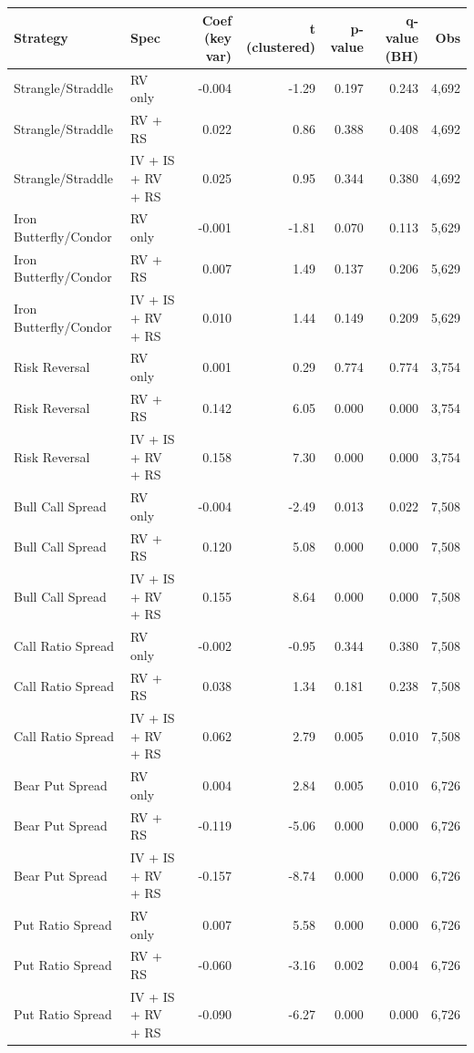 \begin{tabular}{llrrrrr}
\toprule
Strategy & Spec & Coef (key var) & t (clustered) & p-value & q-value (BH) & Obs \\
\midrule
Strangle/Straddle & RV only & -0.004 & -1.29 & 0.197 & 0.243 & 4,692 \\
Strangle/Straddle & RV + RS & 0.022 & 0.86 & 0.388 & 0.408 & 4,692 \\
Strangle/Straddle & IV + IS + RV + RS & 0.025 & 0.95 & 0.344 & 0.380 & 4,692 \\
Iron Butterfly/Condor & RV only & -0.001 & -1.81 & 0.070 & 0.113 & 5,629 \\
Iron Butterfly/Condor & RV + RS & 0.007 & 1.49 & 0.137 & 0.206 & 5,629 \\
Iron Butterfly/Condor & IV + IS + RV + RS & 0.010 & 1.44 & 0.149 & 0.209 & 5,629 \\
Risk Reversal & RV only & 0.001 & 0.29 & 0.774 & 0.774 & 3,754 \\
Risk Reversal & RV + RS & 0.142 & 6.05 & 0.000 & 0.000 & 3,754 \\
Risk Reversal & IV + IS + RV + RS & 0.158 & 7.30 & 0.000 & 0.000 & 3,754 \\
Bull Call Spread & RV only & -0.004 & -2.49 & 0.013 & 0.022 & 7,508 \\
Bull Call Spread & RV + RS & 0.120 & 5.08 & 0.000 & 0.000 & 7,508 \\
Bull Call Spread & IV + IS + RV + RS & 0.155 & 8.64 & 0.000 & 0.000 & 7,508 \\
Call Ratio Spread & RV only & -0.002 & -0.95 & 0.344 & 0.380 & 7,508 \\
Call Ratio Spread & RV + RS & 0.038 & 1.34 & 0.181 & 0.238 & 7,508 \\
Call Ratio Spread & IV + IS + RV + RS & 0.062 & 2.79 & 0.005 & 0.010 & 7,508 \\
Bear Put Spread & RV only & 0.004 & 2.84 & 0.005 & 0.010 & 6,726 \\
Bear Put Spread & RV + RS & -0.119 & -5.06 & 0.000 & 0.000 & 6,726 \\
Bear Put Spread & IV + IS + RV + RS & -0.157 & -8.74 & 0.000 & 0.000 & 6,726 \\
Put Ratio Spread & RV only & 0.007 & 5.58 & 0.000 & 0.000 & 6,726 \\
Put Ratio Spread & RV + RS & -0.060 & -3.16 & 0.002 & 0.004 & 6,726 \\
Put Ratio Spread & IV + IS + RV + RS & -0.090 & -6.27 & 0.000 & 0.000 & 6,726 \\
\bottomrule
\end{tabular}
